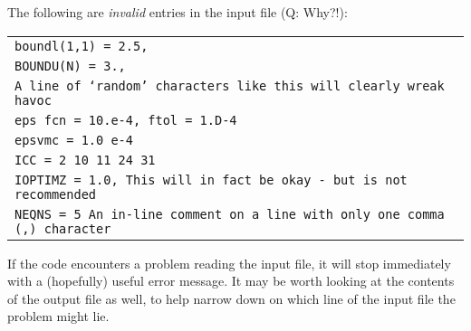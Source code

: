 The following are \textit{invalid}\/ entries in the input file
(Q: Why?!):
\begin{center}
\begin{tabular}{||l}
$\!\!$\texttt{boundl(1,1) = 2.5,} \\
$\!\!$\texttt{BOUNDU(N) = 3.,} \\
$\!\!$\texttt{A line of `random' characters like this will clearly wreak havoc} \\
$\!\!$\texttt{eps fcn = 10.e-4, ftol = 1.D-4} \\
$\!\!$\texttt{epsvmc = 1.0 e-4} \\
$\!\!$\texttt{ICC =   2  10  11  24  31} \\
$\!\!$\texttt{IOPTIMZ = 1.0,  This will in fact be okay - but is not recommended} \\
$\!\!$\texttt{NEQNS = 5    An in-line comment on a line with only one comma (,) character} \\
\end{tabular}
\end{center}

If the code encounters a problem reading the input file, it will stop immediately
with a (hopefully) useful error message. It may be worth looking at the
contents of the output file as well, to help narrow down on which line of the
input file the problem might lie.
\normalsize

